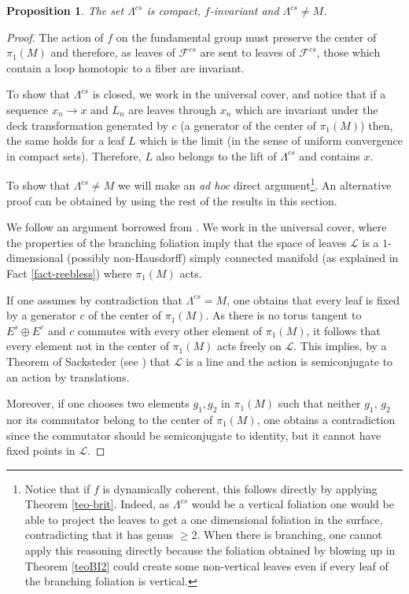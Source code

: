 \documentclass[11pt]{amsart} %
\newcommand{\Fcs}{\mathcal{F}^{cs}}
\numberwithin{equation}{section}
\newtheorem{prop}[equation]{Proposition}
\theoremstyle{remark}
\begin{document}
\begin{prop}\label{prop-Lambdacompactinv} 
The set $\Lambda^{cs}$ is compact, $f$-invariant and $\Lambda^{cs}\neq M$. 
\end{prop}
\begin{proof} The action of $f$ on the fundamental group must preserve the center of $\pi_1(M)$ and therefore, as leaves of $\Fcs$ are sent to leaves of $\Fcs$, those which contain a loop homotopic to a fiber are invariant.  

To show that $\Lambda^{cs}$ is closed, we work in the universal cover, and notice that if a sequence $x_n \to x$ and $L_n$ are leaves through $x_n$ which are invariant under the deck transformation generated by $c$ (a generator of the center of $\pi_1(M)$) then, the same holds for a leaf $L$ which is the limit (in the sense of uniform convergence in compact sets). Therefore, $L$ also belongs to the lift of $\Lambda^{cs}$ and contains $x$. %

To show that $\Lambda^{cs} \neq M$ we will make an \emph{ad hoc} direct argument\footnote{Notice that if $f$ is dynamically coherent, this follows directly by applying Theorem \ref{teo-brit}. Indeed, as $\Lambda^{cs}$ would be a vertical foliation one would be able to project the leaves to get a one dimensional foliation in the surface, contradicting that it has genus $\geq 2$. When there is branching, one cannot apply this reasoning directly because the foliation obtained by blowing up in Theorem \ref{teoBI2} could create some non-vertical leaves even if every leaf of the branching foliation is vertical.}. An alternative proof can be obtained by using the rest of the results in this section. 

We follow an argument borrowed from \cite{Barbot2}. We work in the universal cover, where the properties of the branching foliation imply that the space of leaves $\mathcal{L}$ is a $1$-dimensional (possibly non-Hausdorff) simply connected manifold  (as explained in Fact \ref{fact-reebless}) where $\pi_1(M)$ acts. %

If one assumes by contradiction that $\Lambda^{cs}=M$, one obtains that every leaf is fixed by  a generator $c$ of the center of $\pi_1(M)$. As there is no torus tangent to $E^s \oplus E^c$ and $c$ commutes with every other element of $\pi_1(M)$, it follows that every element not in the center of $\pi_1(M)$ acts freely on $\mathcal{L}$. This implies, by a Theorem of Sacksteder (see \cite[Theorem 3.3]{Barbot2}) that $\mathcal{L}$ is a line and the action is semiconjugate to an action by translations. 

Moreover, if one chooses two elements $g_1,g_2$ in $\pi_1(M)$ such that neither $g_1$, $g_2$ nor its commutator belong to the center of $\pi_1(M)$, one obtains a contradiction since the commutator should be semiconjugate to identity, but it cannot have fixed points in $\mathcal{L}$.  %
\end{proof}
\end{document}
